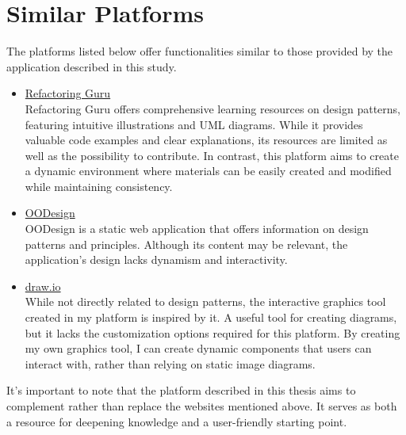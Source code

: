 \section{Similar Platforms}

The platforms listed below offer functionalities similar to those provided by the application described in this study.

\begin{itemize}
    \item \href{https://refactoring.guru/design-patterns}{Refactoring Guru} \\
    Refactoring Guru offers comprehensive learning resources on design patterns, featuring intuitive illustrations and UML diagrams. While it provides valuable code examples and clear explanations, its resources are limited as well as the possibility to contribute. In contrast, this platform aims to create a dynamic environment where materials can be easily created and modified while maintaining consistency.
    
    \item \href{https://www.oodesign.com/}{OODesign} \\
    OODesign is a static web application that offers information on design patterns and principles. Although its content may be relevant, the application's design lacks dynamism and interactivity.
    
    \item \href{https://www.drawio.com/}{draw.io} \\
    While not directly related to design patterns, the interactive graphics tool created in my platform is inspired by it. A useful tool for creating diagrams, but it lacks the customization options required for this platform. By creating my own graphics tool, I can create dynamic components that users can interact with, rather than relying on static image diagrams.
\end{itemize}

\noindent It's important to note that the platform described in this thesis aims to complement rather than replace the websites mentioned above. It serves as both a resource for deepening knowledge and a user-friendly starting point.